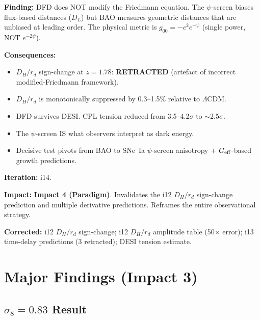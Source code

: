 \documentclass[11pt,a4paper]{article}
\newcommand{\impfour}{\textcolor{impact4}{\textbf{Impact 4 (Paradigm)}}}
\newcommand{\LCDM}{$\Lambda$CDM}
\begin{document}
\begin{tcolorbox}[colback=red!5!white, colframe=red!70!black,
  title=\textbf{Distance-Bias Paradigm Correction --- Iteration 14}]

\textbf{Finding:} DFD does NOT modify the Friedmann equation. The
$\psi$-screen biases flux-based distances ($D_L$) but BAO measures
geometric distances that are unbiased at leading order. The physical
metric is $g_{00} = -c^2 e^{-\psi}$ (single power, NOT $e^{-2\psi}$).

\textbf{Consequences:}
\begin{itemize}
  \item $D_H/r_d$ sign-change at $z = 1.78$: \textbf{RETRACTED} (artefact
    of incorrect modified-Friedmann framework).
  \item $D_H/r_d$ is monotonically suppressed by 0.3--1.5\% relative
    to \LCDM.
  \item DFD survives DESI. CPL tension reduced from 3.5--4.2$\sigma$ to
    $\sim$2.5$\sigma$.
  \item The $\psi$-screen IS what observers interpret as dark energy.
  \item Decisive test pivots from BAO to SNe~Ia $\psi$-screen anisotropy
    + $G_{\rm eff}$-based growth predictions.
\end{itemize}

\textbf{Iteration:} i14.

\textbf{Impact:} \impfour. Invalidates the i12 $D_H/r_d$ sign-change
prediction and multiple derivative predictions. Reframes the entire
observational strategy.

\textbf{Corrected:} i12 $D_H/r_d$ sign-change; i12 $D_H/r_d$ amplitude
table (50$\times$ error); i13 time-delay predictions (3 retracted);
DESI tension estimate.

\end{tcolorbox}


\section{Major Findings (Impact 3)}
\label{sec:impact3}

\subsection{$\sigma_8 = 0.83$ Result}
\label{sec:sigma8}
\end{document}
